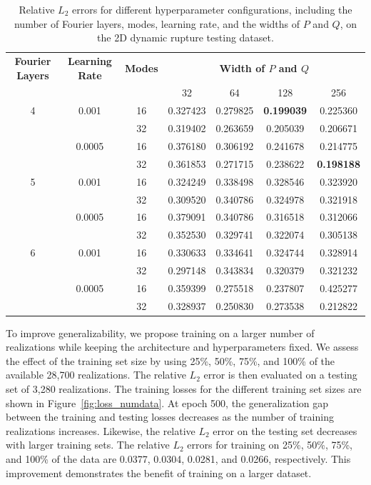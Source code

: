 \documentclass[draft]{agujournal2019}
\begin{document}
\begin{table}[ht!]
\caption{Relative \( L_2 \) errors for different hyperparameter configurations, including the number of Fourier layers, modes, learning rate, and the widths of \( P \) and \( Q \), on the 2D dynamic rupture testing dataset.}
    \centering
    \begin{tabular}{ccccccc}
        \toprule
        \textbf{Fourier Layers} & \textbf{Learning Rate} & \textbf{Modes} & \multicolumn{4}{c}{\textbf{Width of \(P\) and \(Q\)}} \\
        \cmidrule(lr){4-7}
        & & & 32 & 64 & 128 & 256 \\
        \midrule
        4 & 0.001  & 16  & 0.327423 & 0.279825 & \textbf{0.199039}  & 0.225360  \\
         &         & 32  & 0.319402 & 0.263659  & 0.205039  & 0.206671  \\
         & 0.0005  & 16  & 0.376180 & 0.306192  & 0.241678  & 0.214775  \\
         &         & 32  & 0.361853 & 0.271715  & 0.238622  & \textbf{0.198188}  \\
        \midrule
        5 & 0.001  & 16  & 0.324249  & 0.338498  & 0.328546  & 0.323920  \\
         &         & 32  & 0.309520  & 0.340786  & 0.324978  & 0.321918  \\
         & 0.0005  & 16  & 0.379091  & 0.340786  & 0.316518  & 0.312066  \\
         &         & 32  & 0.352530  & 0.329741  & 0.322074  & 0.305138  \\
        \midrule
        6 & 0.001  & 16  & 0.330633  & 0.334641  & 0.324744  & 0.328914  \\
          &        & 32  & 0.297148  & 0.343834  & 0.320379  & 0.321232  \\
          & 0.0005 & 16  & 0.359399  & 0.275518  & 0.237807  & 0.425277  \\
          &        & 32  & 0.328937  & 0.250830  & 0.273538  & 0.212822  \\
        \bottomrule
    \end{tabular}
    \label{tab:2D_hyperparam}
\end{table}

To improve generalizability, we propose training on a larger number of realizations while keeping the architecture and hyperparameters fixed. We assess the effect of the training set size by using 25\%, 50\%, 75\%, and 100\% of the available 28,700 realizations. The relative \(L_2\) error is then evaluated on a testing set of 3,280 realizations. The training losses for the different training set sizes are shown in Figure~\ref{fig:loss_numdata}. At epoch 500, the generalization gap between the training and testing losses decreases as the number of training realizations increases. Likewise, the relative \(L_2\) error on the testing set decreases with larger training sets. The relative \(L_2\) errors for training on 25\%, 50\%, 75\%, and 100\% of the data are 0.0377, 0.0304, 0.0281, and 0.0266, respectively. This improvement demonstrates the benefit of training on a larger dataset.
\end{document}

